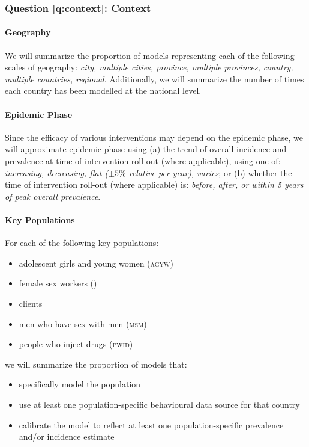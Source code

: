 \documentclass{article}
\begin{document}
\subsubsection{Question \ref{q:context}: Context}
\paragraph{Geography}
We will summarize the proportion of models representing
each of the following scales of geography:
\emph{city, multiple cities, province, multiple provinces, country, multiple countries, regional}.
Additionally, we will summarize the number of times each country has been modelled at the national level.
\paragraph{Epidemic Phase}
Since the efficacy of various interventions may depend on the epidemic phase, %
we will approximate epidemic phase using %
(a) the trend of overall \hiv incidence and prevalence
at time of intervention roll-out (where applicable), using one of:
\emph{increasing, decreasing, flat ($\pm 5\%$ relative per year), varies}; or
(b) whether the time of intervention roll-out (where applicable) is:
\emph{before, after, or within 5 years of peak overall \hiv prevalence}.
\paragraph{Key Populations}
For each of the following key populations:
\begin{itemize}[topsep=0pt]
  \item adolescent girls and young women (\textsc{agyw}) %
  \item female sex workers (\fsw)
  \item \fsw clients
  \item men who have sex with men (\textsc{msm})
  \item people who inject drugs (\textsc{pwid})
\end{itemize}
we will summarize the proportion of models that:
\begin{itemize}[topsep=0pt]
  \item specifically model the population
  \item use at least one population-specific behavioural data source for that country
  \item calibrate the model to reflect at least one population-specific \hiv prevalence and/or incidence estimate
\end{itemize}
\end{document}

